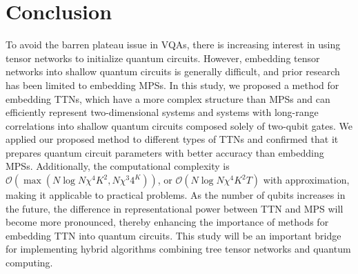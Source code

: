 \documentclass[12pt,dvipdfmx,twoside,openright]{report}
\begin{document}
\chapter{Conclusion}
To avoid the barren plateau issue in VQAs, there is increasing interest in using tensor networks to initialize quantum circuits. 
However, embedding tensor networks into shallow quantum circuits is generally difficult, and prior research has been limited to embedding MPSs.
In this study, we proposed a method for embedding TTNs, which have a more complex structure than MPSs and can efficiently represent two-dimensional systems and systems with long-range correlations into shallow quantum circuits composed solely of two-qubit gates.
We applied our proposed method to different types of TTNs and confirmed that it prepares quantum circuit parameters with better accuracy than embedding MPSs.
Additionally, the computational complexity is $\mathcal{O}(\max (N\log{N}\chi^4 K^2, N\chi^3 4^K))$, or $\mathcal{O}(N\log{N}\chi^4 K^2T)$ with approximation, making it applicable to practical problems.
As the number of qubits increases in the future, the difference in representational power between TTN and MPS will become more pronounced, thereby enhancing the importance of methods for embedding TTN into quantum circuits.
This study will be an important bridge for implementing hybrid algorithms combining tree tensor networks and quantum computing.



\end{document}
